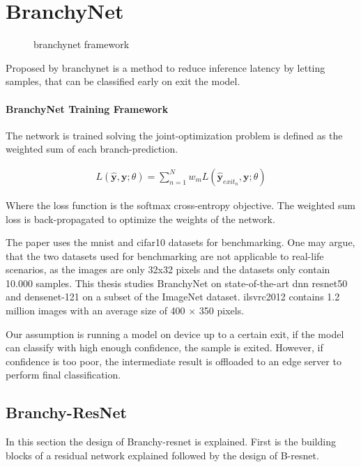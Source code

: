 \section{BranchyNet}

\begin{figure}
	branchynet framework
\end{figure}

Proposed by \citeauthor{teerapittayanon_branchynet:_2016} \gls{branchynet} \cite{teerapittayanon_branchynet:_2016} is a method to reduce inference latency by letting samples, that can be classified early on exit the model.

\paragraph{BranchyNet Training Framework}

The network is trained solving the joint-optimization problem is defined as the weighted sum of each branch-prediction.

\begin{align*}
L(\hat{\mathbf{y}},\mathbf{y};\theta) = \sum_{n=1}^{N} w_m L(\hat{\mathbf{y}}_{exit_n},\mathbf{y};\theta)
\end{align*}

Where the loss function is the softmax cross-entropy objective.
The weighted sum loss is back-propagated to optimize the weights of the network. 

The paper uses the \gls{mnist} and \gls{cifar10} datasets for benchmarking. One may argue, that the two datasets used for benchmarking are not applicable to real-life scenarios, as the images are only 32x32 pixels and the datasets only contain 10.000 samples. This thesis studies BranchyNet on state-of-the-art \gls{dnn} \gls{resnet}50 and \gls{densenet}-121 on a subset of the ImageNet dataset. \gls{ilsvrc2012} contains 1.2 million images with an average size of 400 $\times$ 350 pixels.

Our assumption is running a model on device up to a certain exit, if the model can classify with high enough confidence, the sample is exited. However, if confidence is too poor, the intermediate result is offloaded to an edge server to perform final classification.  

\subsection{Branchy-ResNet}

In this section the design of Branchy-\gls{resnet} is explained. First is the building blocks of a residual network explained followed by the design of B-\gls{resnet}. 

